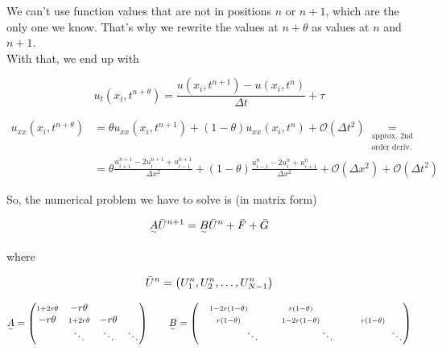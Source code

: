 We can't use function values that are not in positions $n$ or $n+1$, which are the only one we know. That's why we rewrite the values at $n+\theta$ as values at $n$ and $n+1$.\\

With that, we end up with

\[
  u_t(x_i,t^{n+\theta}) = \frac{u(x_i,t^{n+1}) - u(x_i,t^n)}{\Delta t} + \tau
\]

\begin{align*}
  u_{xx}(x_i,t^{n+\theta}) &= \theta u_{xx}(x_i,t^{n+1}) + (1-\theta)u_{xx}(x_i,t^n) + \mathcal{O}(\Delta t^2) \underset{\substack{\text{approx. 2nd}\\\text{order deriv.}}}{=}\\
  &= \theta \frac{u_{i+1}^{n+1} - 2u_i^{n+1} + u_{i-1}^{n+1}}{\Delta x^2} + (1-\theta)\frac{u_{i-1}^n - 2u_i^n + u_{i+1}^n}{\Delta x^2} + \mathcal{O}(\Delta x^2) + \mathcal{O}(\Delta t^2)
\end{align*}

So, the numerical problem we have to solve is (in matrix form)

\[
  \underset{^\sim}{A}\Bar{U}^{n+1} = \underset{^\sim}{B}\Bar{U}^n + \Bar{F} + \Bar{G}
\]

where

\[
  \Bar{U}^n = \left( U_1^n, U_2^n, \ldots, U_{N-1}^n \right)
\]

\[
  \underset{^\sim}{A} = \begin{pmatrix}
    \scriptstyle{\small 1+2r\theta} & -r\theta              \\
    -r\theta   & \scriptstyle{\small 1+2r\theta} & -r\theta \\
    &\ddots     & \ddots     & \ddots
  \end{pmatrix} \qquad \underset{^\sim}{B} = \begin{pmatrix}
    \scriptstyle{\small 1-2r(1-\theta)} & \scriptstyle{\small r(1-\theta)}            \\
    \scriptstyle{\small r(1-\theta)}   & \scriptstyle{\small 1-2r(1-\theta)} & \scriptstyle{\small r(1-\theta)} \\
    \hspace{1.7cm}\ddots  & \hspace{1.9cm} \ddots     & \hspace{1.7cm} \ddots
  \end{pmatrix}
\]

